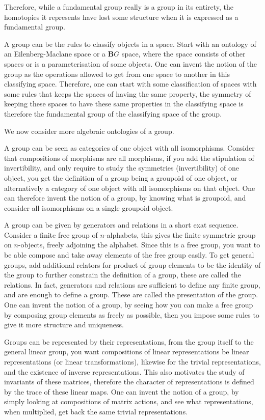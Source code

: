 \documentclass{tufte-book}
\begin{document}
Therefore, while a fundamental group really is a group in its entirety, the homotopies it represents have lost some structure when it is expressed as a fundamental group.

A group can be the rules to classify objects in a space. Start with an ontology of an Eilenberg-Maclane space or a $\mathbf{B}G$ space, where the space consists of other spaces or is a parameterisation of some objects. One can invent the notion of the group as the operations allowed to get from one space to another in this classifying space. Therefore, one can start with some classification of spaces with some rules that keeps the spaces of having the same property, the symmetry of keeping these spaces to have these same properties in the classifying space is therefore the fundamental group of the classifying space of the group.

We now consider more algebraic ontologies of a group.

A group can be seen as categories of one object with all isomorphisms. Consider that compositions of morphisms are all morphisms, if you add the stipulation of invertibility, and only require to study the symmetries (invertibility) of one object, you get the definition of a group being a groupoid of one object, or alternatively a category of one object with all isomorphisms on that object. One can therefore invent the notion of a group, by knowing what is groupoid, and consider all isomorphisms on a single groupoid object.

A group can be given by generators and relations in a short exat sequence. Consider a finite free group of $n$-alphabets, this gives the finite symmetric group on $n$-objects, freely adjoining the alphabet. Since this is a free group, you want to be able compose and take away elements of the free group easily. To get general groups, add additional relators for product of group elements to be the identity of the group to further constrain the definition of a group, these are called the relations. In fact, generators and relations are sufficient to define any finite group, and are enough to define a group. These are called the presentation of the group. One can invent the notion of a group, by seeing how you can make a free group by composing group elements as freely as possible, then you impose some rules to give it more structure and uniqueness.

Groups can be represented by their representations, from the group itself to the general linear group, you want compositions of linear representations be linear representations (or linear transformations), likewise for the trivial representations, and the existence of inverse representations. This also motivates the study of invariants of these matrices, therefore the character of representations is defined by the trace of these linear maps. One can invent the notion of a group, by simply looking at compositions of matrix actions, and see what representations, when multiplied, get back the same trivial representations.
\end{document}
